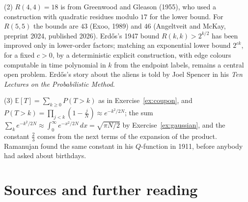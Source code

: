 (2) $R(4,4)=18$ is from Greenwood and Gleason (1955), who used a construction with quadratic residues modulo $17$ for the lower bound. For $R(5,5)$ the bounds are $43$ (Exoo, 1989) and $46$ (Angeltveit and McKay, preprint 2024, published 2026). Erd\H os's 1947 bound $R(k,k)>2^{k/2}$ has been improved only in lower-order factors; matching an exponential lower bound $2^{ck}$, for a fixed $c>0$, by a deterministic explicit construction, with edge colours computable in time polynomial in $k$ from the endpoint labels, remains a central open problem. Erd\H os's story about the aliens is told by Joel Spencer in his \emph{Ten Lectures on the Probabilistic Method}.

(3) $\mathbb E[T]=\sum_{k\ge0}P(T>k)$ as in Exercise~\ref{ex:coupon}, and $P(T>k)=\prod_{j<k}(1-\frac jN)\approx e^{-k^2/2N}$; the sum $\sum_ke^{-k^2/2N}\approx\int_0^\infty e^{-x^2/2N}\,dx=\sqrt{\pi N/2}$ by Exercise~\ref{ex:gaussian}, and the constant $\frac23$ comes from the next terms of the expansion of the product. Ramanujan found the same constant in his $Q$-function in 1911, before anybody had asked about birthdays.

\section*{Sources and further reading}


